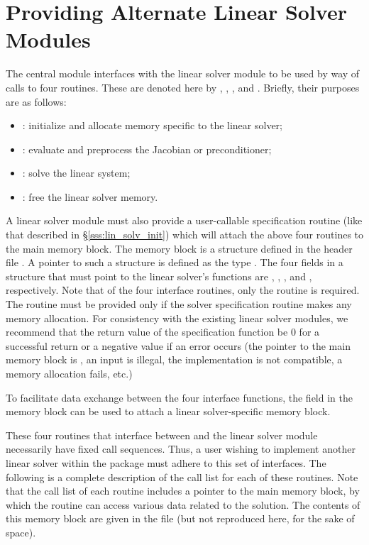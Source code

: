 \chapter{Providing Alternate Linear Solver Modules}\label{s:new_linsolv}
The central {\kinsol} module interfaces with the linear solver module 
to be used by way of calls to four routines.  These are denoted here by 
, , , and .
Briefly, their purposes are as follows:
\begin{itemize}
\item {}: initialize and allocate memory specific to the
  linear solver;
\item {}: evaluate and preprocess the Jacobian or preconditioner;
\item {}: solve the linear system;
\item {}: free the linear solver memory.
\end{itemize}
A linear solver module must also provide a user-callable specification
routine (like that described in \S\ref{sss:lin_solv_init}) which will
attach the above four routines to the main {\kinsol} memory block.
The {\kinsol} memory block is a structure defined in the header file
. A pointer to such a structure is defined as the
type . The four fields in a  structure that
must point to the linear solver's functions are ,
, , and , respectively.
Note that of the four interface routines, only the  routine
is required. The  routine must be provided only if the solver
specification routine makes any memory allocation.
For consistency with the existing {\kinsol} linear solver modules, we
recommend that the return value of the specification function be $0$ for
a successful return or a negative value if an error occurs (the
pointer to the main {\kinsol} memory block is , an input is
illegal, the {\nvector} implementation is not compatible, a memory
allocation fails, etc.)

To facilitate data exchange between the four interface functions, the
field  in the {\kinsol} memory block can be used to attach
a linear solver-specific memory block.

These four routines that interface between {\kinsol} and the linear solver module
necessarily have fixed call sequences.  Thus, a user wishing to implement another 
linear solver within the {\kinsol} package must adhere to this set of interfaces.
The following is a complete description of the call list for each of
these routines.  Note that the call list of each routine includes a
pointer to the main {\kinsol} memory block, by which the routine can access
various data related to the {\kinsol} solution.  The contents of this memory
block are given in the file  (but not reproduced here, for
the sake of space).

